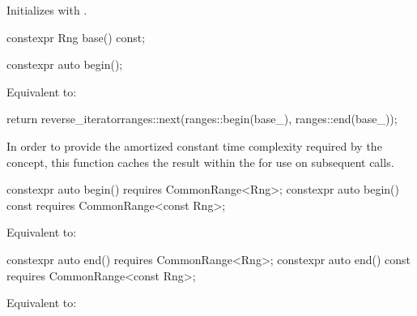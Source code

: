 {\begin{itemdescr}
\pnum
\effects Initializes  with .
\end{itemdescr}

%
\begin{itemdecl}
constexpr Rng base() const;
\end{itemdecl}

\begin{itemdescr}
\pnum
\oldtxt{\returns}  
\end{itemdescr}

%
\begin{itemdecl}
constexpr auto begin();
\end{itemdecl}

\begin{itemdescr}
\pnum
\effects Equivalent to:
\begin{codeblock}
return reverse_iterator{ranges::next(ranges::begin(base_), ranges::end(base_))};
\end{codeblock}

\pnum
\remarks In order to provide the amortized constant time complexity required by
the  concept, this function caches the result within the
 for use on subsequent calls.
\end{itemdescr}

%
\begin{itemdecl}
constexpr auto begin() requires CommonRange<Rng>;
constexpr auto begin() const requires CommonRange<const Rng>;
\end{itemdecl}

\begin{itemdescr}
\pnum
\effects Equivalent to: 
\end{itemdescr}

%
\begin{itemdecl}
constexpr auto end() requires CommonRange<Rng>;
constexpr auto end() const requires CommonRange<const Rng>;
\end{itemdecl}

\begin{itemdescr}
\pnum
\effects Equivalent to: 
\end{itemdescr}

}
